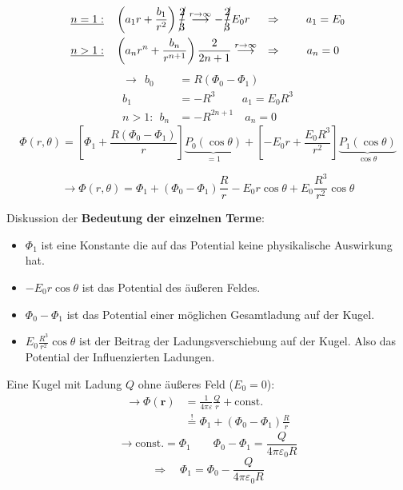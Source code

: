 \documentclass[titlepage,11pt,a4paper,ngerman]{report}
\newcommand{\tx}[1]{\textrm{#1}}
\newcommand{\const}{\tx{const.}}
\newcommand{\ub}[1]{\underbrace{#1}}
\newcommand{\pofr}{\Phi(\vec{r})}
\renewcommand{\Phi}{\varPhi}
\renewcommand{\vec}[1]{\boldsymbol{#1}}
\renewcommand{\epsilon}{\varepsilon}
\newcommand{\frbox}[2]{\begin{tcolorbox}[colback=white,colframe=red!75!black,fonttitle=\bfseries,title=#1]#2\end{tcolorbox}}
\begin{document}
\begin{enumerate}[i)]
\begin{align*}
	&\underline{n = 1:} \quad \left(a_1 r + \frac{b_1}{r^2}\right)\cancel{\frac{2}{3}} \buildrel r \to \infty \over \longrightarrow - \cancel{\frac{2}{3}} E_0 r \quad \ \Rightarrow \ \, \quad \ \  a_1 = E_0\\
	&\underline{n > 1:} \quad \left(a_n r^n + \frac{b_n}{r^{n+1}}\right) \frac{2}{2n+1} \buildrel r \to \infty \over \longrightarrow \quad \Rightarrow \qquad \: a_n = 0
	\end{align*}
	\begin{align*}
	\rightarrow \ \ b_0 &= R(\Phi_0 - \Phi_1)\\
	b_1 &= - R^3 \qquad \ \, a_1 = E_0 R^3\\
	n>1: \ \ b_n &= - R^{2n+1} \quad a_n = 0
	\end{align*}
	\begin{equation*}
	\Phi(r,\theta) = \left[\Phi_1 + \frac{R(\Phi_0 - \Phi_1)}{r}\right] \ub{P_0(\cos\theta)}_{=1} + \left[-E_0 r + \frac{E_0 R^3}{r^2}\right] \ub{P_1(\cos\theta)}_{\cos\theta}
	\end{equation*}
	\frbox{Potential einer Kugel im homogenen $ \vec{E} $-Feld}{\begin{equation*}
	\rightarrow\Phi(r,\theta) = \Phi_1 + (\Phi_0 - \Phi_1) \frac{R}{r} - E_0 r\cos\theta + E_0\frac{R^3}{r^2} \cos\theta
	\end{equation*}}
\end{enumerate}
Diskussion der \textbf{Bedeutung der einzelnen Terme}:
\begin{itemize}
	\item 	$ \Phi_1 $ ist eine Konstante die auf das Potential keine physikalische Auswirkung hat.
	\item $ -E_0 r \cos\theta $ ist das Potential des äußeren Feldes.
	\item $ \Phi_0 - \Phi_1 $ ist das Potential einer möglichen Gesamtladung auf der Kugel.
	\item $ E_0\frac{R^3}{r^2} \cos \theta $ ist der Beitrag der Ladungsverschiebung auf der Kugel. Also das Potential der Influenzierten Ladungen.
\end{itemize}
\begin{minipage}{.7\linewidth}
	Eine Kugel mit Ladung $ Q $ ohne äußeres Feld ($ E_0 = 0 $):
	\begin{align*}
	\rightarrow\pofr &= \frac{1}{4 \pi \epsilon} \frac{Q}{r} + \const\\
	&\overset{!}{=} \Phi_1 + (\Phi_0 - \Phi_1) \frac{R}{r}
	\end{align*}
	\begin{equation*}
	\rightarrow \const = \Phi_1 \qquad \Phi_0 - \Phi_1 = \frac{Q}{4 \pi \epsilon_0 R}
	\end{equation*}
	\begin{equation*}
	\Rightarrow \quad \Phi_1 = \Phi_0 - \frac{Q}{4 \pi \epsilon_0 R}
	\end{equation*}
	\vspace{5pt}
\end{minipage}%
\end{document}
